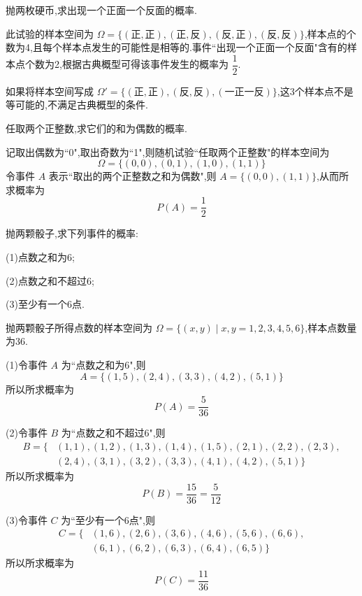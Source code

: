 
\question 抛两枚硬币,求出现一个正面一个反面的概率.

\begin{solution}
    此试验的样本空间为 $\varOmega = \{ (\text{正}, \text{正}), (\text{正}, \text{反}), (\text{反}, \text{正}), (\text{反}, \text{反}) \}$,样本点的个数为4,且每个样本点发生的可能性是相等的.事件``出现一个正面一个反面"含有的样本点个数为2,根据古典概型可得该事件发生的概率为 $\dfrac{1}{2}$.
\end{solution}

\begin{note}
    \indent 如果将样本空间写成 $\varOmega' = \{ (\text{正}, \text{正}), (\text{反}, \text{反}), (\text{一正一反}) \}$,这3个样本点不是等可能的,不满足古典概型的条件.
\end{note}

\question 任取两个正整数,求它们的和为偶数的概率.

\begin{solution}
    记取出偶数为``0",取出奇数为``1",则随机试验``任取两个正整数"的样本空间为
    $$
    \varOmega = \{ (0,0), (0,1), (1,0), (1,1) \}
    $$
    令事件 $A$ 表示``取出的两个正整数之和为偶数",则 $A = \{ (0,0), (1,1) \}$,从而所求概率为 $$P(A) = \dfrac{1}{2}$$
\end{solution}

\question 抛两颗骰子,求下列事件的概率:

(1)点数之和为6;

(2)点数之和不超过6;

(3)至少有一个6点.

\begin{solution}
    抛两颗骰子所得点数的样本空间为 $\varOmega = \{ (x,y) \mid x,y=1,2,3,4,5,6 \}$,样本点数量为36.

    (1)令事件 $A$ 为``点数之和为6",则
    $$
    A = \{ (1,5), (2,4), (3,3), (4,2), (5,1) \}
    $$
    所以所求概率为
    $$
    P(A) = \dfrac{5}{36}
    $$

    (2)令事件 $B$ 为``点数之和不超过6",则
    $$
    \begin{aligned}
        B = \{ & (1,1), (1,2), (1,3), (1,4), (1,5), (2,1), (2,2), (2,3), \\
        & (2,4), (3,1), (3,2), (3,3), (4,1), (4,2), (5,1) \}
    \end{aligned}
    $$
    所以所求概率为
    $$
    P(B) = \dfrac{15}{36} = \dfrac{5}{12}
    $$

    (3)令事件 $C$ 为``至少有一个6点",则
    $$
    \begin{aligned}
        C = \{ & (1,6), (2,6), (3,6), (4,6), (5,6), (6,6), \\
        & (6,1), (6,2), (6,3), (6,4), (6,5) \}
    \end{aligned}
    $$
    所以所求概率为
    $$
    P(C) = \dfrac{11}{36}
    $$
\end{solution}

